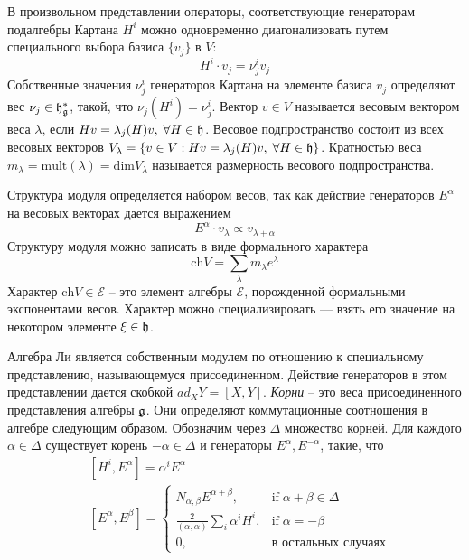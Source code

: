 В произвольном представлении операторы, соответствующие генераторам подалгебры Картана $H^{i}$ можно одновременно диагонализовать путем специального выбора базиса
 $\{v_{j}\}$ в $V$:
\begin{equation}
  \label{eq:3}
  H^{i}\cdot v_{j}=\nu_{j}^{i}v_{j}
\end{equation}
Собственные значения $\nu^{i}_{j}$ генераторов Картана на элементе базиса $v_{j}$ определяют вес  $\nu_{j}\in \mathfrak{h}_{\mathfrak{g}}^{*}$, такой, что $\nu_{j}(H^{i})=\nu_{j}^{i}$. Вектор $v\in V$ называется весовым вектором веса  $\lambda$, если $H v=\lambda_{j}(H)v,\; \forall H\in \mathfrak{h}$. Весовое подпространство состоит из всех весовых векторов $V_{\lambda}=\{v\in V: H v=\lambda_{j}(H)v,\; \forall H\in \mathfrak{h}\}$. Кратностью веса  $m_{\lambda}=\mathrm{mult}(\lambda)=\mathrm{dim} V_{\lambda}$ называется размерность весового подпространства.

Структура модуля определяется набором весов, так как действие генераторов $E^{\alpha}$ на весовых векторах дается выражением
\begin{equation}
  \label{eq:5}
  E^{\alpha}\cdot v_{\lambda} \propto v_{\lambda+\alpha}
\end{equation}
Структуру модуля можно записать в виде формального характера
\begin{equation}
  \label{eq:10}
  \mathrm{ch}V=\sum_{\lambda}m_{\lambda} e^{\lambda}
\end{equation}
Характер  $\mathrm{ch}V\in \mathcal{E}$ -- это элемент алгебры  $\mathcal{E}$, порожденной формальными экспонентами весов. Характер можно специализировать --- взять его значение на некотором элементе $\xi\in\mathfrak{h}$.

Алгебра Ли является собственным модулем по отношению к специальному представлению, называющемуся присоединенном. Действие генераторов в этом представлении дается скобкой $ad_{X} Y=[X,Y]$. 
{\it Корни} -- это веса присоединенного представления алгебры $\mathfrak{g}$.  Они определяют коммутационные соотношения в алгебре следующим образом. Обозначим через $\Delta$ множество корней. Для каждого $\alpha\in \Delta$ существует корень  $-\alpha\in \Delta$ и генераторы $E^{\alpha}, E^{-\alpha}$, такие, что
\begin{align}
  \label{eq:4}
  &  [H^{i},E^{\alpha}]=\alpha^{i}E^{\alpha} \\
  &\left[E^{\alpha},E^{\beta}\right]=
  \begin{cases}
    N_{\alpha,\beta} E^{\alpha+\beta}, & \mbox{if}\; \alpha+\beta\in \Delta\\
    \frac{2}{(\alpha,\alpha)} \sum_{i}\alpha^{i} H^{i},&  \mbox{if}\; \alpha=-\beta\\
    0,&\mbox{в остальных случаях}
  \end{cases}
\end{align}

